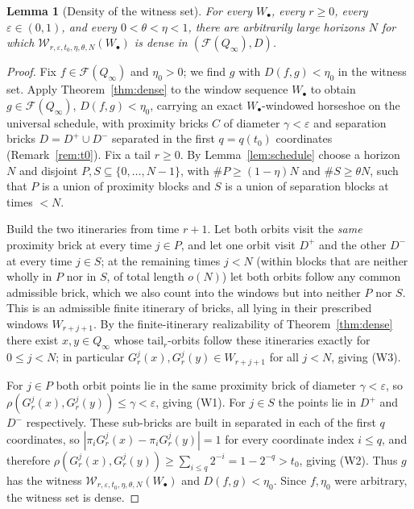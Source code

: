 \documentclass[11pt]{article}
\newtheorem{lemma}[theorem]{Lemma}
\newcommand{\Q}{Q_\infty}
\newcommand{\F}{\mathcal{F}}
\newcommand{\W}{\mathcal{W}}
\begin{document}
\begin{lemma}[Density of the witness set]\label{lem:density}
For every \(W_\bullet\), every \(r\ge0\), every \(\varepsilon\in(0,1)\), and every
\(0<\theta<\eta<1\), there are arbitrarily large horizons \(N\) for which
\(\W_{r,\varepsilon,t_0,\eta,\theta,N}(W_\bullet)\) is dense in \((\F(\Q),D)\).
\end{lemma}

\begin{proof}
Fix $f\in\F(\Q)$ and $\eta_0>0$; we find $g$ with $D(f,g)<\eta_0$ in the witness set.
Apply Theorem~\ref{thm:dense} to the window sequence $W_\bullet$ to obtain
$g\in\F(\Q)$, $D(f,g)<\eta_0$, carrying an exact $W_\bullet$-windowed horseshoe on the
universal schedule, with proximity bricks $C$ of diameter $\gamma<\varepsilon$ and
separation bricks $D=D^{+}\cup D^{-}$ separated in the first $q=q(t_0)$ coordinates
(Remark~\ref{rem:t0}).  Fix a tail \(r\ge0\).  By Lemma~\ref{lem:schedule} choose a
horizon \(N\) and disjoint \(P,S\subseteq\{0,\dots,N-1\}\), with
\(\#P\ge(1-\eta)N\) and \(\#S\ge\theta N\), such that \(P\) is a union of proximity
blocks and \(S\) is a union of separation blocks at times \(<N\).

Build the two itineraries from time $r+1$.  Let both orbits visit the \emph{same}
proximity brick at every time $j\in P$, and let one orbit visit $D^{+}$ and the other
$D^{-}$ at every time $j\in S$; at the remaining times $j<N$ (within blocks that are
neither wholly in $P$ nor in $S$, of total length $o(N)$) let both orbits follow any
common admissible brick, which we also count into the windows but into neither $P$ nor
$S$.  This is an admissible finite itinerary of bricks, all lying in their prescribed
windows $W_{r+j+1}$.  By the finite-itinerary realizability of Theorem~\ref{thm:dense}
there exist $x,y\in\Q$ whose $\mathrm{tail}_r$-orbits follow these itineraries exactly
for $0\le j<N$; in particular $G^j_r(x),G^j_r(y)\in W_{r+j+1}$ for all $j<N$, giving
(W3).

For $j\in P$ both orbit points lie in the same proximity brick of diameter
$\gamma<\varepsilon$, so $\rho(G^j_r(x),G^j_r(y))\le\gamma<\varepsilon$, giving (W1).
For $j\in S$ the points lie in $D^{+}$ and $D^{-}$ respectively.  These sub-bricks are
built in \cite[\S12]{Shmalo2026} separated in each of the first $q$ coordinates, so
$|\pi_iG^j_r(x)-\pi_iG^j_r(y)|=1$ for every coordinate index $i\le q$, and therefore
$\rho(G^j_r(x),G^j_r(y))\ge\sum_{i\le q}2^{-i}=1-2^{-q}>t_0$, giving (W2).  Thus \(g\) has
the witness \(\W_{r,\varepsilon,t_0,\eta,\theta,N}(W_\bullet)\) and
$D(f,g)<\eta_0$.  Since $f,\eta_0$ were arbitrary, the witness set is dense.
\end{proof}
\end{document}
